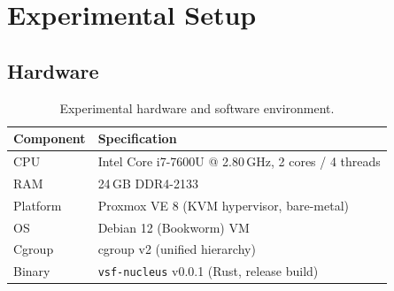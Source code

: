 \documentclass[11pt, a4paper]{article}
\newcommand{\nucleus}{\texttt{vsf-nucleus}}
\begin{document}
%
%
%

\section{Experimental Setup}
\label{sec:setup}

%

\subsection{Hardware}
\label{sec:hardware}

\begin{table}[h]
\centering
\caption{Experimental hardware and software environment.}
\label{tab:hardware}
\begin{tabular}{ll}
\toprule
\textbf{Component} & \textbf{Specification} \\
\midrule
CPU     & Intel Core i7-7600U @ 2.80\,GHz, 2 cores / 4 threads \\
RAM     & 24\,GB DDR4-2133 \\
Platform & Proxmox VE 8 (KVM hypervisor, bare-metal) \\
OS      & Debian 12 (Bookworm) VM \\
Cgroup  & cgroup v2 (unified hierarchy) \\
Binary  & \nucleus{} v0.0.1 (Rust, release build) \\
\bottomrule
\end{tabular}
\end{table}
\end{document}
